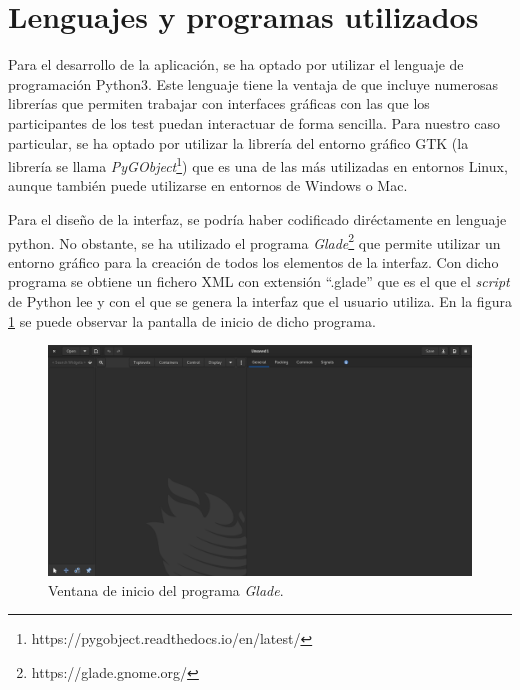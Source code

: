 \documentclass[11pt,a4paper]{book}
\begin{document}
        \section{Lenguajes y programas utilizados}
            Para el desarrollo de la aplicación, se ha optado por utilizar el lenguaje de programación Python3. Este lenguaje tiene la ventaja de que incluye numerosas librerías que permiten trabajar con interfaces gráficas con las que los participantes de los test puedan interactuar de forma sencilla. Para nuestro caso particular, se ha optado por utilizar la librería del entorno gráfico GTK (la librería se llama \textit{PyGObject}\footnote{https://pygobject.readthedocs.io/en/latest/}) que es una de las más utilizadas en entornos Linux, aunque también puede utilizarse en entornos de Windows o Mac.
            
            Para el diseño de la interfaz, se podría haber codificado diréctamente en lenguaje python. No obstante, se ha utilizado el programa \textit{Glade}\footnote{https://glade.gnome.org/} que permite utilizar un entorno gráfico para la creación de todos los elementos de la interfaz. Con dicho programa se obtiene un fichero XML con extensión ``.glade'' que es el que el \textit{script} de Python lee y con el que se genera la interfaz que el usuario utiliza. En la figura \ref{fig:gladeInic} se puede observar la pantalla de inicio de dicho programa. 
            
            \begin{figure}[H]
                \begin{center}
                    \includegraphics[scale=.2]{../imagenes/gladeInicio.png}
                    \caption{Ventana de inicio del programa \textit{Glade}.}
                    \label{fig:gladeInic}
                \end{center}
            \end{figure}
            
\end{document}

